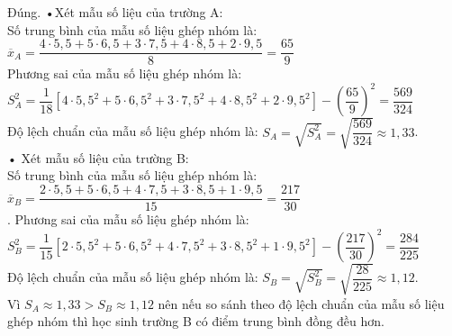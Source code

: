 \begin{ex}
{\begin{itemchoice}
			\itemch Đúng. •Xét mẫu số liệu của trường A:\\
			Số trung bình của mẫu số liệu ghép nhóm là:\\
			${\overline x _A} = \dfrac{ 4 \cdot 5{,}5 + 5\cdot 6{,}5 + 3\cdot 7{,}5 + 4\cdot 8{,}5 + 2\cdot 9{,}5}{8} = \dfrac{65}{9}$\\
			Phương sai của mẫu số liệu ghép nhóm là:\\
			$S_A^2 = \dfrac{1}{18}\left[4\cdot 5,5^2 + 5\cdot 6{,}5^2 + 3\cdot 7{,}5^2 + 4\cdot 8{,}5^2 + 2\cdot 9{,}5^2\right] - {\left( {\dfrac{65}{9}} \right)^2} = \dfrac{569}{324}$\\
			Độ lệch chuẩn của mẫu số liệu ghép nhóm là:  $S_A = \sqrt {S_A^2}  = \sqrt {\dfrac{569}{324}}  \approx 1{,}33$.\\
			• Xét mẫu số liệu của trường B:\\
			Số trung bình của mẫu số liệu ghép nhóm là:\\
			${\overline x _B} = \dfrac{2\cdot 5{,}5 + 5\cdot 6{,}5 + 4\cdot 7{,}5 + 3\cdot 8{,}5 + 1\cdot 9{,}5}{15} = \dfrac{217}{30}$\\
			.
			Phương sai của mẫu số liệu ghép nhóm là:\\
			$S_B^2 = \dfrac{1}{15}\left[ {2\cdot 5{,}5^2 + 5\cdot 6{,}5^2 + 4\cdot 7{,}5^2 + 3\cdot 8{,}5^2 + 1\cdot 9{,}5^2} \right] - \left( {\dfrac{217}{30}} \right)^2 = \dfrac{284}{225}$\\
			Độ lệch chuẩn của mẫu số liệu ghép nhóm là:  $S_B = \sqrt {S_B^2}  = \sqrt {\dfrac{28}{225}}  \approx 1{,}12$.\\
			Vì $S_A \approx 1{,}33 >S_B \approx 1{,}12$ nên nếu so sánh theo độ lệch chuẩn của mẫu số liệu ghép nhóm thì học sinh trường B có điểm trung bình đồng đều hơn. 
			
			
		\end{itemchoice}
	}
\end{ex}

